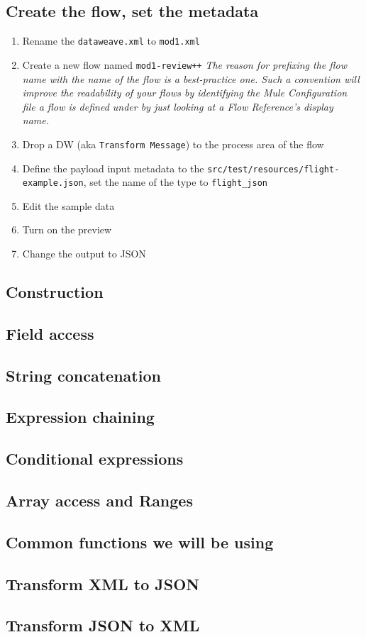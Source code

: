 \subsection{Create the flow, set the metadata}
\begin{enumerate}
\item Rename the \texttt{dataweave.xml} to \texttt{mod1.xml}
\item Create a new flow named \texttt{mod1-review++}
  \newline
  \emph{
    The reason for prefixing the flow name with the name of the flow is a best-practice one.
    Such a convention will improve the readability of your flows by identifying the
    Mule Configuration file a flow is defined under by just looking at a Flow Reference's
    display name.
  }
\item Drop a DW (aka \texttt{Transform Message}) to the process area of the flow
\item Define the payload input metadata to the \texttt{src/test/resources/flight-example.json},
  set the name of the type to \texttt{flight\_json}
\item Edit the sample data
\item Turn on the preview
\item Change the output to JSON
\end{enumerate}

\subsection{Construction}

\subsection{Field access}

\subsection{String concatenation}

\subsection{Expression chaining}

\subsection{Conditional expressions}

\subsection{Array access and Ranges}

\subsection{Common functions we will be using}

\subsection{Transform XML to JSON}

\subsection{Transform JSON to XML}

